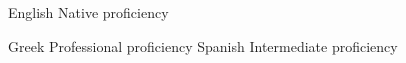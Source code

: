 
\begin{cvskills}

  \cvskill
    {English} %
    {Native proficiency} %

  \cvskill
    {Greek} %
    {Professional proficiency} %
  \cvskill
    {Spanish} %
    {Intermediate proficiency} %
    
\end{cvskills}
